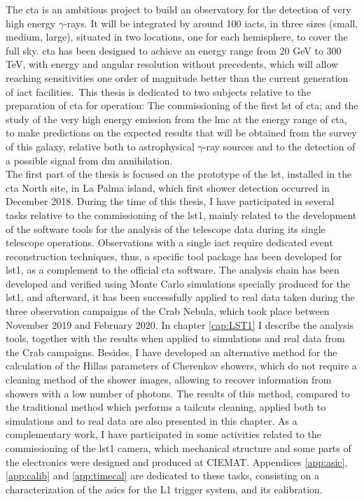 \documentclass[main.tex]{subfiles}
\begin{document}
\glsresetall

The \gls{cta} is an ambitious project to build an observatory for the detection of very high energy $\gamma$-rays. It will be integrated by around 100 \glspl{iact}, in three sizes (small, medium, large), situated in two locations, one for each hemisphere, to cover the full sky. \gls{cta} has been designed to achieve an energy range from 20 GeV to 300 TeV, with energy and angular resolution without precedents, which will allow reaching sensitivities one order of magnitude better than the current generation of \gls{iact} facilities.\
This thesis is dedicated to two subjects relative to the preparation of \gls{cta} for operation: The commissioning of the first \gls{lst} of \gls{cta}; and the study of the very high energy emission from the \gls{lmc} at the energy range of \gls{cta}, to make predictions on the expected results that will be obtained from the survey of this galaxy, relative both to astrophysical $\gamma$-ray sources and to the detection of a possible signal from \gls{dm} annihilation.\\
The first part of the thesis is focused on the prototype of the \gls{lst}, installed in the \gls{cta} North site, in La Palma island, which first shower detection occurred in December 2018.
During the time of this thesis, I have participated in several tasks relative to the commissioning of the \gls{lst}1, mainly related to the development of the software tools for the analysis of the telescope data during its single telescope operations. Observations with a single \gls{iact} require dedicated event reconstruction techniques, thus, a specific tool package has been developed for \gls{lst}1, as a complement to the official \gls{cta} software. The analysis chain has been developed and verified using Monte Carlo simulations specially produced for the \gls{lst}1, and afterward, it has been successfully applied to real data taken during the three observation campaigns of the Crab Nebula, which took place between November 2019 and February 2020. In chapter \ref{cap:LST1} I describe the analysis tools, together with the results when applied to simulations and real data from the Crab campaigns. Besides, I have developed an alternative method for the calculation of the Hillas parameters of Cherenkov showers, which do not require a cleaning method of the shower images, allowing to recover information from showers with a low number of photons. The results of this method, compared to the traditional method which performs a tailcuts cleaning, applied both to simulations and to real data are also presented in this chapter. As a complementary work, I have participated in some activities related to the commissioning of the \gls{lst}1 camera, which mechanical structure and some parts of the electronics were designed and produced at CIEMAT. Appendices \ref{app:asic}, \ref{app:calib} and \ref{app:timecal} are dedicated to these tasks, consisting on a characterization of the \glspl{asic} for the L1 trigger system, and its calibration.\\
\end{document}
